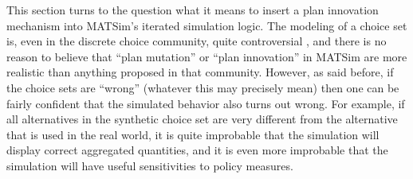 This section turns to the question what it means to insert a plan
innovation mechanism into MATSim's iterated simulation logic. The
modeling of a choice set is, even in the discrete choice community,
quite controversial \citep{frejinger-2010}, and there is no reason
to believe that {}``plan mutation'' or {}``plan innovation'' in
MATSim are more realistic than anything proposed in that community.
However, as said before, if the choice sets are {}``wrong'' (whatever
this may precisely mean) then one can be fairly confident that the
simulated behavior also turns out wrong.
%
For example, if all alternatives in the synthetic choice set are very different from the alternative that is used in the real world, it is quite improbable that the simulation will display correct aggregated quantities, and it is even more improbable that the simulation will have useful sensitivities to policy measures.



